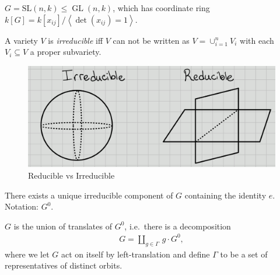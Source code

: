 \begin{example}

\begin{example}

\(G = {\text{SL}}(n, k) \leq \operatorname{GL}(n, k)\), which has
coordinate ring
\(k[G] = k[x_{ij}] / \left\langle{\det(x_{ij}) = 1}\right\rangle\).

\end{example}

\end{example}

\begin{definition}[Irreducible]

\begin{definition}[Irreducible]

A variety \(V\) is \emph{irreducible} iff \(V\) can not be written as
\(V = \cup_{i=1}^n V_i\) with each \(V_i \subseteq V\) a proper
subvariety.

\begin{figure}
\centering
\includegraphics{figures/Reducible_v_irreducible.png}
\caption{Reducible vs Irreducible}
\end{figure}

\end{definition}

\end{definition}

\begin{proposition}[?]

\begin{proposition}[?]

There exists a unique irreducible component of \(G\) containing the
identity \(e\). Notation: \(G^0\).

\end{proposition}

\end{proposition}

\begin{proposition}[?]

\begin{proposition}[?]

\(G\) is the union of translates of \(G^0\), i.e.~there is a
decomposition
\begin{align*}   G = {\coprod}_{g\in \Gamma} \, g\cdot G^0 ,\end{align*}
where we let \(G\) act on itself by left-translation and define
\(\Gamma\) to be a set of representatives of distinct orbits.

\end{proposition}

\end{proposition}

